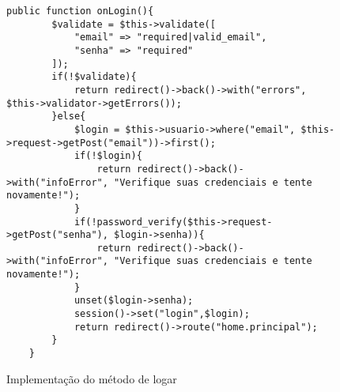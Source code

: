 \begin{figure}
    \centering
    \begin{lstlisting}[style=phplisting]
        public function onLogin(){
        $validate = $this->validate([
            "email" => "required|valid_email",
            "senha" => "required"
        ]);
        if(!$validate){
            return redirect()->back()->with("errors", $this->validator->getErrors());
        }else{
            $login = $this->usuario->where("email", $this->request->getPost("email"))->first();
            if(!$login){
                return redirect()->back()->with("infoError", "Verifique suas credenciais e tente novamente!");
            }
            if(!password_verify($this->request->getPost("senha"), $login->senha)){
                return redirect()->back()->with("infoError", "Verifique suas credenciais e tente novamente!");
            }
            unset($login->senha);
            session()->set("login",$login);
            return redirect()->route("home.principal");
        }
    }
    \end{lstlisting}
    \caption{Implementação do método de logar}
    \label{cod:loginController}
\end{figure}